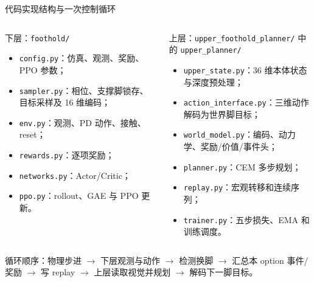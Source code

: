 \documentclass[aspectratio=169,10pt]{beamer}
\newcommand{\code}[1]{\texttt{#1}}
\begin{document}
\begin{frame}{代码实现结构与一次控制循环}
\scriptsize
\begin{columns}[T,onlytextwidth]
\begin{block}{下层：\code{foothold/}}
\begin{itemize}
  \item \code{config.py}：仿真、观测、奖励、PPO 参数；
  \item \code{sampler.py}：相位、支撑脚锁存、目标采样及 16 维编码；
  \item \code{env.py}：观测、PD 动作、接触、reset；
  \item \code{rewards.py}：逐项奖励；
  \item \code{networks.py}：Actor/Critic；
  \item \code{ppo.py}：rollout、GAE 与 PPO 更新。
\end{itemize}
\end{block}
\begin{block}{上层：\code{upper\_foothold\_planner/} 中的 \code{upper\_planner/}}
\begin{itemize}
  \item \code{upper\_state.py}：36 维本体状态与深度预处理；
  \item \code{action\_interface.py}：三维动作解码为世界脚目标；
  \item \code{world\_model.py}：编码、动力学、奖励/价值/事件头；
  \item \code{planner.py}：CEM 多步规划；
  \item \code{replay.py}：宏观转移和连续序列；
  \item \code{trainer.py}：五步损失、EMA 和训练调度。
\end{itemize}
\end{block}
\end{columns}
\vspace{0.3em}
循环顺序：物理步进 $\rightarrow$ 下层观测与动作 $\rightarrow$ 检测换脚 $\rightarrow$ 汇总本 option 事件/奖励 $\rightarrow$ 写 replay $\rightarrow$ 上层读取视觉并规划 $\rightarrow$ 解码下一脚目标。
\end{frame}
\end{document}
